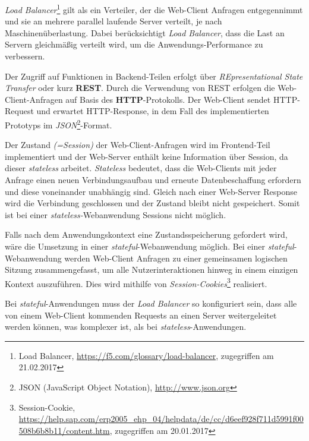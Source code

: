 
\textit{Load Balancer}\footnote{Load Balancer, \url{https://f5.com/glossary/load-balancer}, zugegriffen am 21.02.2017} gilt als ein Verteiler, der die Web-Client Anfragen entgegennimmt und sie an mehrere parallel laufende Server verteilt, je nach Maschinenüberlastung. Dabei berücksichtigt \textit{Load Balancer}, dass die Last an Servern gleichmäßig verteilt wird, um die Anwendungs-Performance zu verbessern.

Der Zugriff auf Funktionen in Backend-Teilen erfolgt über \textit{REpresentational State Transfer} oder kurz \textbf{REST}. Durch die Verwendung von REST erfolgen die Web-Client-Anfragen auf Basis des \textbf{HTTP}-Protokolls. Der Web-Client sendet HTTP-Request und erwartet HTTP-Response, in dem Fall des implementierten Prototyps im \textit{JSON}\footnote{JSON (JavaScript Object Notation), \url{http://www.json.org}}-Format.

Der Zustand \textit{(=Session)} der Web-Client-Anfragen wird im Frontend-Teil implementiert und der Web-Server enthält keine Information über Session, da dieser \textit{stateless} arbeitet. \textit{Stateless} bedeutet, dass die Web-Clients mit jeder Anfrage einen neuen Verbindungsaufbau und erneute Datenbeschaffung erfordern und diese voneinander unabhängig sind. Gleich nach einer Web-Server Response wird die Verbindung geschlossen und der Zustand bleibt nicht gespeichert. Somit ist bei einer \textit{stateless-}Webanwendung Sessions nicht möglich.

Falls nach dem Anwendungskontext eine Zustandsspeicherung gefordert wird, wäre die Umsetzung in einer \textit{stateful}-Webanwendung möglich. Bei einer \textit{stateful}-Webanwendung werden Web-Client Anfragen zu einer gemeinsamen logischen Sitzung zusammengefasst, um alle Nutzerinteraktionen hinweg in einem einzigen Kontext auszuführen. Dies wird mithilfe von \textit{Session-Cookies}\footnote{Session-Cookie, \url{https://help.sap.com/erp2005_ehp_04/helpdata/de/cc/d6eef928f711d5991f00508b6b8b11/content.htm}, zugegriffen am 20.01.2017} realisiert.

Bei \textit{stateful}-Anwendungen muss der \textit{Load Balancer} so konfiguriert sein, dass alle von einem Web-Client kommenden Requests an einen Server weitergeleitet werden können, was komplexer ist, als bei \textit{stateless}-Anwendungen. 

